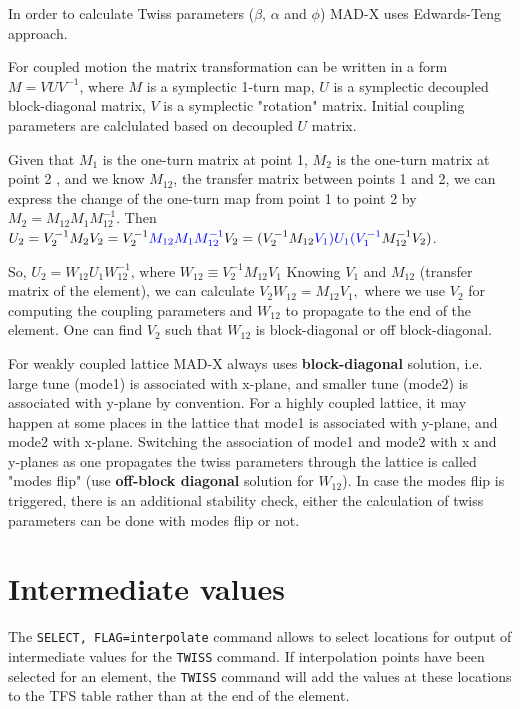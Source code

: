In order to calculate Twiss parameters ($\beta$, $\alpha$ and $\phi$) MAD-X uses Edwards-Teng approach.

For coupled motion the matrix transformation can be written in a form $M = VUV^{-1}$, where $M$ is a symplectic 1-turn map, $U$ is a symplectic decoupled block-diagonal matrix, $V$ is a symplectic "rotation" matrix. Initial coupling parameters are calclulated based on decoupled $U$ matrix. 
  
Given that $M_1$ is the one-turn matrix at point 1, $M_2$ is the one-turn matrix at point 2 , and we know $M_{12}$, the transfer matrix between points 1 and 2, we can express the change of the one-turn map from point 1 to point 2 by {\color{blue} $M_2 = M_{12}M_1M^{-1}_{12}$}. Then $U_2 = V_2^{-1}M_2V_2 = V_2^{-1} {\color{blue}M_{12}M_1M^{-1}_{12}} V_2 = ( V_2^{-1} M_{12} {\color{blue}V_1) U_1 (V_1^{-1}} M^{-1}_{12} V_2)$.

So,  $U_2 = W_{12} U_1 W_{12}^{-1} \textrm{, where } W_{12} \equiv V_2^{-1} M_{12}  V_1 $
Knowing $V_1$ and $M_{12}$  (transfer matrix of the element), we can calculate $V_2 W_{12} = M_{12} V_1,$ where we use $V_{2}$ for computing the coupling parameters and $W_{12}$ to propagate to the end of the element. One can find $V_2$ such that $W_{12}$ is block-diagonal or off block-diagonal. 
  
For weakly coupled lattice MAD-X always uses \textbf{block-diagonal} solution, i.e. large tune (mode1) is associated with x-plane, and smaller tune (mode2) is associated with y-plane by convention. For a highly coupled lattice, it may happen at some places in the lattice that mode1 is associated with y-plane, and mode2 with x-plane. Switching the association of mode1 and mode2 with x and y-planes as one propagates the twiss parameters through the lattice is called "modes flip" (use \textbf{off-block diagonal} solution for $W_{12}$). In case the modes flip is triggered, there is an additional stability check, either the calculation of twiss parameters can be done with modes flip or not. 

\section{Intermediate values}

The \texttt{SELECT, FLAG=interpolate} command allows to select locations for
output of intermediate values for the \texttt{TWISS} command. If interpolation
points have been selected for an element, the \texttt{TWISS} command will add
the values at these locations to the TFS table rather than at the end of the
element.

